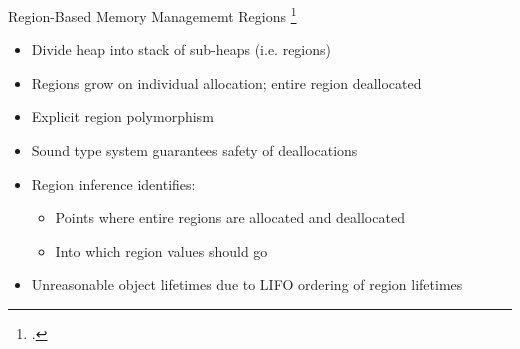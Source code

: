 \documentclass[aspectratio=169]{beamer}
\begin{document}
\begin{frame}{Region-Based Memory Managememt}
    Regions \footcite{tofte_region-based_1997}
    \begin{itemize}[<+->]
        \item Divide heap into stack of sub-heaps (i.e. regions) 
        \item Regions grow on individual allocation; \alert{entire} region deallocated 
        \item Explicit region polymorphism 
        \item Sound type system \alert{guarantees safety} of deallocations 
        \item Region inference identifies:
            \begin{itemize}
                \item Points where entire regions are allocated and deallocated
                \item Into which region values should go
            \end{itemize}
        \item Unreasonable object lifetimes due to LIFO ordering of region lifetimes %
    \end{itemize}
    \vspace{0.1in}
\end{frame}
\end{document}

